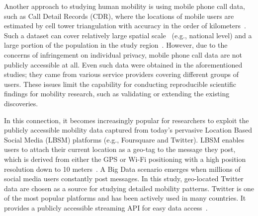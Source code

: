 \documentclass[ijgi,article,accept,moreauthors,pdftex,10pt,a4paper]{mdpi}
\theoremstyle{mdpi}
\newcounter{ex}
\newcounter{re}
\theoremstyle{mdpidefinition}
\begin{document}
Another approach to studying human mobility is using mobile phone call data, such as Call Detail Records (CDR), where the locations of mobile users are estimated by cell tower triangulation with accuracy in the order of kilometers~\cite{gonzalez2008understanding,sevtsuk2010does,kung2014exploring}.
Such a dataset can cover relatively large spatial scale~\cite{becker2013human,sobolevsky2013delineating} (e.g., national level) and a large portion of the population in the study region~\cite{kung2014exploring}.
However, due to the concerns of infringement on individual privacy, mobile phone call data are not publicly accessible at all.
Even such data were obtained in the aforementioned studies; they came from various service providers covering different groups of users.
These issues limit the capability for conducting reproducible scientific findings for mobility research, such as validating or extending the existing discoveries.

In this connection, it becomes increasingly popular for researchers to exploit the publicly accessible mobility data captured from today's pervasive Location Based Social Media (LBSM) platforms (e.g., Foursquare and Twitter).
LBSM enables users to attach their current location as a geo-tag to the message they post, which is derived from either the GPS or Wi-Fi positioning with a high position resolution down to 10 meters~\cite{Jurdak2015}.
A Big Data scenario emerges when millions of social media users constantly post messages.
In this study, geo-located Twitter data are chosen as a source for studying detailed mobility patterns.
Twitter is one of the most popular platforms and has been actively used in many countries.
It provides a publicly accessible streaming API for easy data access~\cite{twitterAPI}.
\end{document}
